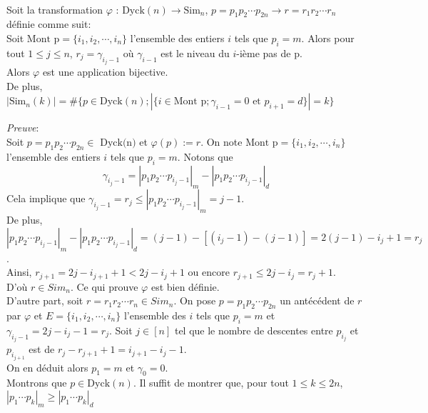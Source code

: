 \begin{proposition} \label{phi_tsfm} \text{ }\\
	Soit la transformation $\varphi$ : $\text{Dyck}(n) \longrightarrow \text{Sim}_n$, $p=p_{1}p_{2}\cdots p_{2n} \longrightarrow r=r_{1}r_{2}\cdots r_{n}$ définie comme suit:\\
	Soit $\text{Mont p}=\{i_{1}, i_{2}, \cdots, i_{n}\}$ l'ensemble des entiers $i$ tels que $p_{i}=m$. Alors pour tout $1\leq j \leq n$, $r_{j} = \gamma_{i_{j}-1}$ où $\gamma_{i-1}$ est le niveau du $i$-ième pas de p.\\
	Alors $\varphi$ est une application bijective.\\
	De plus, $|\text{Sim}_{n}(k)| = \# \{p \in \text{Dyck}(n); |\{i \in \text{Mont p}; \gamma_{i-1}=0 \text{ et } p_{i+1}=d\}|=k\}$

\end{proposition}
\textit{Preuve}:\\
Soit $p=p_{1}p_{2}\cdots p_{2n} \in \text{ Dyck(n)}$ et $\varphi(p):=r$. On note
$\text{Mont p}=\{i_{1}, i_{2}, \cdots, i_{n}\}$ l'ensemble des entiers $i$ tels que $p_{i}=m$. Notons que $$\gamma_{i_{j}-1}= | p_{1}p_{2}\cdots p_{i_{j}-1} |_{m} - | p_{1}p_{2}\cdots p_{i_{j}-1} |_{d}$$ Cela implique que $\gamma_{i_{j}-1} = r_{j} \leq | p_{1}p_{2}\cdots p_{i_{j}-1} |_{m}=j-1$.\\
De plus, $| p_{1}p_{2}\cdots p_{i_{j}-1} |_{m} - | p_{1}p_{2}\cdots p_{i_{j}-1} |_{d}= (j-1)-[(i_{j}-1)-(j-1)]=2(j-1)-i_{j}+1= r_{j}$.\\
Ainsi, $r_{j+1}=2j - i_{j+1}+1< 2j -i_{j}+1$ ou encore $r_{j+1}\leq 2j-i_{j}=r_{j}+1$.\\ D'où $r\in Sim_{n}$. Ce qui prouve $\varphi$ est bien définie.\vspace{10pt}\\
D'autre part, soit $r=r_{1}r_{2}\cdots r_{n}\in Sim_{n}$. On pose $p=p_{1}p_{2}\cdots p_{2n}$ un antécédent de $r$ par $\varphi$ et $E=\{i_{1}, i_{2}, \cdots, i_{n}\}$ l'ensemble des $i$ tels que $p_{i}=m$ et $\gamma_{i_{j}-1}=2j-i_{j}-1=r_{j}$. Soit $j \in [n]$ tel que le nombre de descentes entre $p_{i_{j}}$ et $p_{i_{j+1}}$ est de $r_{j}-r_{j+1}+1=i_{j+1}-i_{j}-1$. \\
On en déduit alors $p_{1}=m$ et $\gamma_{0}=0$.\\
Montrons que $p \in \text{Dyck}(n)$.  Il suffit de montrer que, pour tout $1\leq k\leq 2n$, $| p_{1}\cdots p_{k} |_{m}\geq | p_{1}\cdots p_{k} |_{d}$\\
